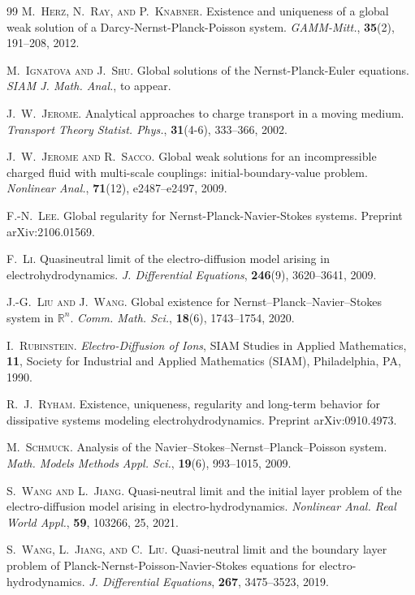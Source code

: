 \documentclass[10pt,twoside,reqno]{amsart}
\numberwithin{figure}{section}
\numberwithin{equation}{section}
\theoremstyle{definition}
\newcommand{\1}{\mathbbm{1}}
\begin{document}
\begin{thebibliography}{99}
 \textsc{M.~Herz, N.~Ray, and P.~Knabner}. Existence and uniqueness of a global weak solution of a {D}arcy-{N}ernst-{P}lanck-{P}oisson system. {\it GAMM-Mitt.}, {\bf 35}(2), 191--208, 2012.

 \textsc{M.~Ignatova and J.~Shu}. Global solutions of the {N}ernst-{P}lanck-{E}uler equations. {\it SIAM J. Math. Anal.}, to appear.

 \textsc{J.~W.~Jerome}. Analytical approaches to charge transport in a moving medium. {\it Transport Theory Statist. Phys.}, {\bf 31}(4-6), 333--366, 2002.

 \textsc{J.~W.~Jerome and R.~Sacco}. Global weak solutions for an incompressible charged fluid with multi-scale couplings: initial-boundary-value problem. {\it Nonlinear Anal.}, {\bf 71}(12), e2487--e2497, 2009.

 \textsc{F.-N.~Lee}. Global regularity for {N}ernst-{P}lanck-{N}avier-{S}tokes systems. Preprint arXiv:2106.01569.

 \textsc{F.~Li}. Quasineutral limit of the electro-diffusion model arising in electrohydrodynamics. {\it J. Differential Equations}, {\bf 246}(9), 3620--3641, 2009.

 \textsc{J.-G.~Liu and J.~Wang}. Global existence for {N}ernst--{P}lanck--{N}avier--{S}tokes system in $\mathbb{R}^n$. {\it Comm. Math. Sci.}, {\bf 18}(6), 1743--1754, 2020.

 \textsc{I.~Rubinstein}. {\it Electro-Diffusion of Ions}, SIAM Studies in Applied Mathematics, {\bf 11}, Society for Industrial and Applied Mathematics (SIAM), Philadelphia, PA, 1990.

 \textsc{R.~J.~Ryham}. Existence, uniqueness, regularity and long-term behavior for dissipative systems modeling electrohydrodynamics. Preprint arXiv:0910.4973.

 \textsc{M.~Schmuck}. Analysis of the {N}avier--{S}tokes--{N}ernst--{P}lanck--{P}oisson system. {\it Math. Models Methods Appl. Sci.}, {\bf 19}(6), 993--1015, 2009.

 \textsc{S.~Wang and L.~Jiang}. Quasi-neutral limit and the initial layer problem of the electro-diffusion model arising in electro-hydrodynamics. {\it Nonlinear Anal. Real World Appl.}, {\bf 59}, 103266, 25, 2021.

 \textsc{S.~Wang, L.~Jiang, and C.~Liu}. Quasi-neutral limit and the boundary layer problem of Planck-Nernst-Poisson-Navier-Stokes equations for electro-hydrodynamics. {\it J. Differential Equations}, {\bf 267}, 3475--3523, 2019.


\end{thebibliography}
\end{document}
